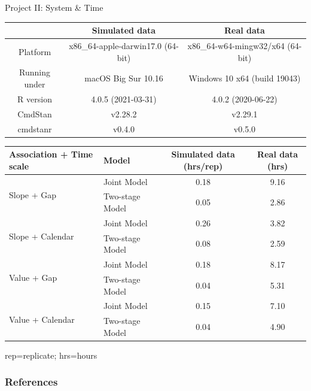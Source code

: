 \documentclass[fleqn]{beamer}
\begin{document}
\begin{frame}{Project II: System \& Time}
\tiny
\begin{table}[H] 
\begin{tabular}{c|c|c}
\toprule
 & \bf Simulated data & \bf Real data\\
\hline
Platform & x86\_64-apple-darwin17.0 (64-bit) & x86\_64-w64-mingw32/x64 (64-bit)\\
\hline
Running under & macOS Big Sur 10.16 & Windows 10 x64 (build 19043)\\
\hline
R version & 4.0.5 (2021-03-31) & 4.0.2 (2020-06-22) \\
\hline
CmdStan & v2.28.2 & v2.29.1 \\
cmdstanr & v0.4.0 & v0.5.0\\ 
\bottomrule
\end{tabular}
\end{table}

\begin{table}[H] 

\begin{threeparttable}
\begin{tabular}{l|l|c|c}
\toprule
Association + Time scale & Model & Simulated data (hrs/rep) & Real data (hrs) \\ \hline
\multirow{2}{*}{Slope + Gap} & Joint Model &  0.18 & 9.16\\
                             & Two-stage Model & 0.05 & 2.86\\ \hline
\multirow{2}{*}{Slope + Calendar} & Joint Model & 0.26 & 3.82\\
                                  & Two-stage Model & 0.08 & 2.59 \\ \hline
\multirow{2}{*}{Value + Gap} & Joint Model & 0.18 & 8.17\\ 
                             & Two-stage Model & 0.04 & 5.31 \\ \hline
\multirow{2}{*}{Value + Calendar} & Joint Model & 0.15 & 7.10 \\              
                                           & Two-stage Model & 0.04 & 4.90\\
\bottomrule
\end{tabular}
 \begin{tablenotes}[para]
 \tiny
  rep=replicate; hrs=hours
    \end{tablenotes}
 \end{threeparttable}
\end{table}
\end{frame}


\begin{frame}[allowframebreaks]
\frametitle{References}
\tiny


\end{frame}
\end{document}
